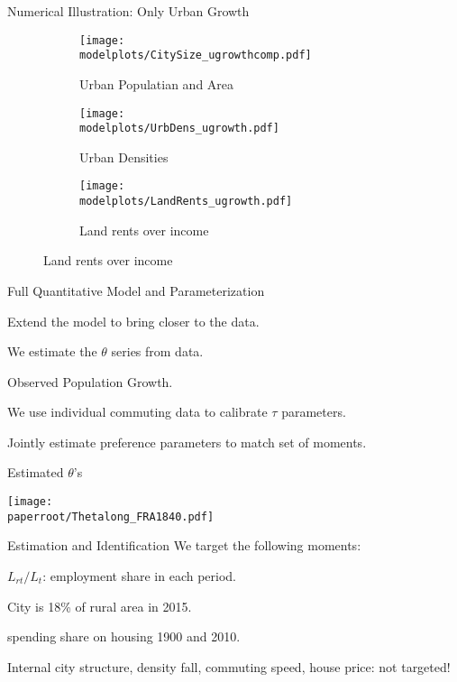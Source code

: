 \documentclass[aspectratio=169]{beamer}
\begin{document}
\begin{v75mins}
\begin{frame}{Numerical Illustration: Only Urban Growth}
\begin{figure}
		\begin{subfigure}[t]{0.32\textwidth}
			\begin{centering}
				\texttt{[image: \\modelplots/CitySize\_ugrowthcomp.pdf]}
				\caption{Urban Populatian and Area}
			\end{centering}
		\end{subfigure}
		\hfill
		\begin{subfigure}[t]{0.32\textwidth}
			\begin{centering}
				\texttt{[image: \\modelplots/UrbDens\_ugrowth.pdf]}			
				\caption{Urban Densities}
			\end{centering}
		\end{subfigure}
		\hfill
		\begin{subfigure}[t]{0.32\textwidth}
			\begin{centering}
				\texttt{[image: \\modelplots/LandRents\_ugrowth.pdf]}
				\caption{Land rents over income}
			\end{centering}
		\end{subfigure}
	\end{figure}
	\end{frame}


\begin{frame}{Full Quantitative Model and Parameterization}
	\begin{midi}
		\item Extend the model to bring closer to the data.
		\item We estimate the $\theta$ series from data.
		\item Observed Population Growth.
		\item We use individual commuting data to calibrate $\tau$ parameters.
		\item Jointly estimate preference parameters to match set of moments.
	\end{midi}
\end{frame}

\begin{frame}{Estimated $\theta$'s}
	\begin{adjustbox}{center}
		\texttt{[image: \\paperroot/Thetalong\_FRA1840.pdf]}

	\end{adjustbox}
\end{frame}

\begin{frame}{Estimation and Identification}
	We target the following moments:\medskip
	\begin{midi}
		\item $L_{rt} / L_t$: employment share in each period.
		\item City is 18\% of rural area in 2015.
		\item spending share on housing 1900 and 2010.
	\end{midi}
\vspace{1cm}
Internal city structure, density fall, commuting speed, house price: not targeted!


\end{frame}
\end{v75mins}
\end{document}
